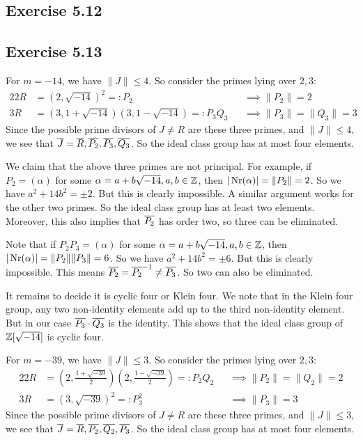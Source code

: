 \documentclass[../Marcus.tex]{subfiles}
\begin{document}
\subsection*{Exercise 5.12}

\subsection*{Exercise 5.13}

For $m=-14$, we have $\|J\| \leq 4$. So consider the primes lying over $2,3$:
\begin{alignat*}{2}
2R &= (2,\sqrt{-14})^2 =: P_2  &&\implies \|P_2\| = 2      \\
3R &= (3,1+\sqrt{-14})(3,1-\sqrt{-14}) =: P_3Q_3    &&\implies \|P_3\| = \|Q_3\| = 3
\end{alignat*}
Since the possible prime divisors of $J\neq R$ are these three primes, and $\|J\| \leq 4$, we see that $\overline{J}=\overline{R},\overline{P_2},\overline{P_3},\overline{Q_3}$. So the ideal class group has at most four elements. 

We claim that the above three primes are not principal. For example, if $P_2 = (\alpha)$ for some $\alpha=a+b\sqrt{-14},a,b\in \mathbb{Z}$, then $|\operatorname{Nr}(\alpha)| = \|P_2\| = 2$. So we have $a^2+14b^2 = \pm2$. But this is clearly impossible. A similar argument works for the other two primes. So the ideal class group has at least two elements. Moreover, this also implies that $\overline{P_2}$ has order two, so three can be eliminated.

Note that if $P_2P_3 = (\alpha)$ for some $\alpha=a+b\sqrt{-14},a,b\in \mathbb{Z}$, then $|\operatorname{Nr}(\alpha)| = \|P_2\|\|P_3\| = 6$. So we have $a^2+14b^2 = \pm6$. But this is clearly impossible. This means $\overline{P_2} = \overline{P_2}^{-1} \neq \overline{P_3}$. So two can also be eliminated.

It remains to decide it is cyclic four or Klein four. We note that in the Klein four group, any two non-identity elements add up to the third non-identity element. But in our case $\overline{P_3} \cdot \overline{Q_3}$ is the identity. This shows that the ideal class group of $\mathbb{Z}[\sqrt{-14}]$ is cyclic four.

For $m=-39$, we have $\|J\| \leq 3$. So consider the primes lying over $2,3$:
\begin{alignat*}{2}
2R &= \left(2,\frac{1+\sqrt{-39}}{2}\right) \left(2,\frac{1-\sqrt{-39}}{2}\right)  =: P_2Q_2  &&\implies \|P_2\| = \|Q_2\| = 2     \\
3R &= (3,\sqrt{-39})^2 =: P_3^2  &&\implies \|P_3\| = 3
\end{alignat*}
Since the possible prime divisors of $J\neq R$ are these three primes, and $\|J\| \leq 3$, we see that $\overline{J}=\overline{R},\overline{P_2},\overline{Q_2},\overline{P_3}$. So the ideal class group has at most four elements.
\end{document}
